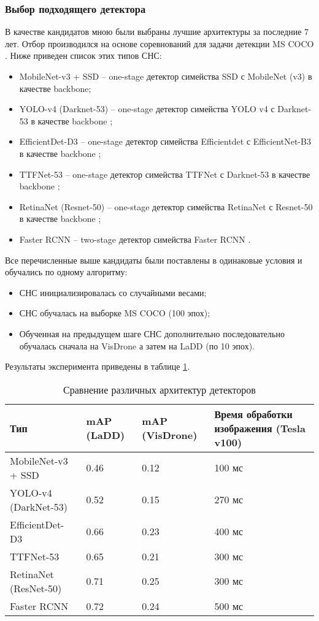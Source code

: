 \subsubsection{Выбор подходящего детектора}

В качестве кандидатов мною были выбраны лучшие архитектуры за последние 7 лет. Отбор производился на основе соревнований для задачи детекции MS COCO \cite{lib-coco}. Ниже приведен список этих типов СНС:
\begin{itemize}
    \item MobileNet-v3 + SSD -- one-stage детектор симейства SSD с MobileNet (v3) \cite{lib-mobilenet} в качестве backbone;
    \item YOLO-v4 (Darknet-53) -- one-stage детектор симейства YOLO v4 с Darknet-53 в качестве backbone \cite{lib-yolo};
    \item EfficientDet-D3 -- one-stage детектор симейства Efficientdet с EfficientNet-B3 в качестве backbone \cite{lib-efficientdet};
    \item TTFNet-53 -- one-stage детектор симейства TTFNet с Darknet-53 в качестве backbone \cite{lib-ttfnet};
    \item RetinaNet (Resnet-50) -- one-stage детектор симейства RetinaNet с Resnet-50 \cite{lib-resnet} в качестве backbone \cite{lib-retinanet};
    \item Faster RCNN -- two-stage детектор симейства Faster RCNN \cite{lib-rcnn}.
\end{itemize}

Все перечисленные выше кандидаты были поставлены в одинаковые условия и обучались по одному алгоритму:
\begin{itemize}
    \item СНС инициализировалась со случайными весами;
    \item СНС обучалась на выборке MS COCO (100 эпох);
    \item Обученная на предыдущем шаге СНС дополнительно последовательно обучалась сначала на VisDrone а затем на LaDD (по 10 эпох).
\end{itemize}

Результаты эксперимента приведены в таблице \ref{leaderboard-table}.

\begin{table}[H]
  \caption{Сравнение различных архитектур детекторов}\label{leaderboard-table}
  \begin{tabular}{|p{4cm}|p{3cm}|p{3cm}|p{5cm}|}
    \hline
    {Тип} & {mAP (LaDD)} & {mAP (VisDrone)} & {Время обработки изображения (Tesla v100)} \\
    \hline
    MobileNet-v3 + SSD & 0.46 & 0.12 & 100 мс \\
    \hline
    YOLO-v4 (DarkNet-53) & 0.52 & 0.15 & 270 мс \\
    \hline
    EfficientDet-D3 & 0.66 & 0.23 & 400 мс \\
    \hline
    TTFNet-53 & 0.65 & 0.21 & 300 мс \\
    \hline
    RetinaNet (ResNet-50) & 0.71 & 0.25 & 300 мс \\
    \hline 
    Faster RCNN & 0.72 & 0.24 & 500 мс \\
    \hline
  \end{tabular}
\end{table}


